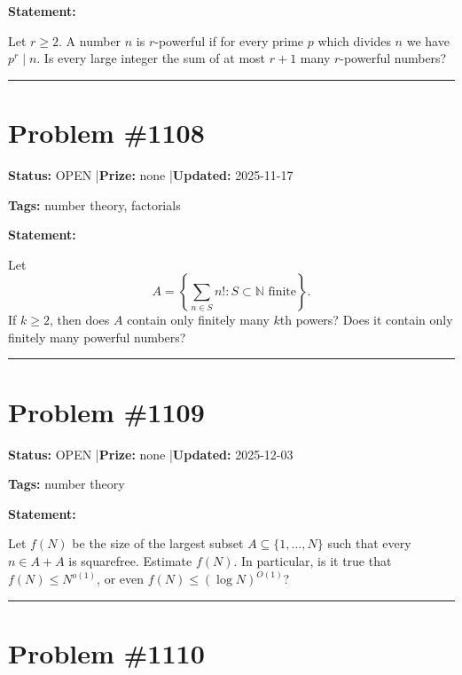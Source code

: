 \documentclass{article}
\begin{document}
\medskip

\noindent\textbf{Statement:}

Let $r\geq 2$. A number $n$ is $r$-powerful if for every prime $p$ which divides $n$ we have $p^r\mid n$. Is every large integer the sum of at most $r+1$ many $r$-powerful numbers?

\noindent\rule{\linewidth}{0.4pt}


\section{Problem \#1108}
\label{prob:1108}

\noindent\textbf{Status:} OPEN \quad|\quad \textbf{Prize:} none \quad|\quad \textbf{Updated:} 2025-11-17

\noindent\textbf{Tags:} number theory, factorials

\medskip

\noindent\textbf{Statement:}

Let\[A = \left\{ \sum_{n\in S}n! : S\subset \mathbb{N}\textrm{ finite}\right\}.\]If $k\geq 2$, then does $A$ contain only finitely many $k$th powers? Does it contain only finitely many powerful numbers?

\noindent\rule{\linewidth}{0.4pt}


\section{Problem \#1109}
\label{prob:1109}

\noindent\textbf{Status:} OPEN \quad|\quad \textbf{Prize:} none \quad|\quad \textbf{Updated:} 2025-12-03

\noindent\textbf{Tags:} number theory

\medskip

\noindent\textbf{Statement:}

Let $f(N)$ be the size of the largest subset $A\subseteq \{1,\ldots,N\}$ such that every $n\in A+A$ is squarefree. Estimate $f(N)$. In particular, is it true that $f(N)\leq N^{o(1)}$, or even $f(N) \leq (\log N)^{O(1)}$?

\noindent\rule{\linewidth}{0.4pt}


\section{Problem \#1110}
\label{prob:1110}
\end{document}

